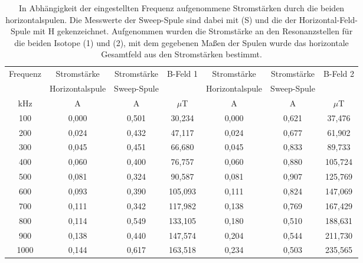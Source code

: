 \begin{table}
  \centering
  \caption{In Abhängigkeit der eingestellten Frequenz aufgenommene Stromstärken durch die beiden horizontalspulen. Die Messwerte der Sweep-Spule sind dabei mit (S) und die der Horizontal-Feld-Spule mit H gekenzeichnet. Aufgenommen wurden die Stromstärke an den Resonanzstellen für die beiden Isotope (1) und (2), mit dem gegebenen Maßen der Spulen wurde das horizontale Gesamtfeld aus den Stromstärken bestimmt.}
  \label{tab,Tab1}
    \begin{tabular}{c c c c c c c}
      \toprule
      Frequenz  & Stromstärke & Stromstärke & B-Feld 1 & Stromstärke & Stromstärke &  B-Feld 2\\
        & Horizontalspule & Sweep-Spule & & Horizontalspule & Sweep-Spule&\\
      kHz & A& A& $\mu$T & A& A& $\mu$T\\
      \midrule
      \midrule
      100     & 0,000  &  0,501 &  30,234  &  0,000 &  0,621 &  37,476 \\
      200     & 0,024  &  0,432 &  47,117  &  0,024 &  0,677 &  61,902 \\
      300     & 0,045  &  0,451 &  66,680  &  0,045 &  0,833 &  89,733 \\
      400     & 0,060  &  0,400 &  76,757  &  0,060 &  0,880 & 105,724 \\
      500     & 0,081  &  0,324 &  90,587  &  0,081 &  0,907 & 125,769 \\
      600     & 0,093  &  0,390 & 105,093  &  0,111 &  0,824 & 147,069 \\
      700     & 0,111  &  0,342 & 117,982  &  0,138 &  0,769 & 167,429 \\
      800     & 0,114  &  0,549 & 133,105  &  0,180 &  0,510 & 188,631 \\
      900     & 0,138  &  0,440 & 147,574  &  0,204 &  0,544 & 211,730 \\
      1000    & 0,144  &  0,617 & 163,518  &  0,234 &  0,503 & 235,565 \\
      \bottomrule
    \end{tabular}
\end{table}
